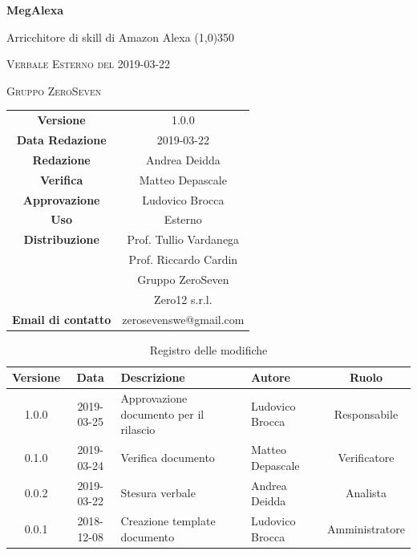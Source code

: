 \documentclass[a4paper,12pt]{article}
\author{Andrea Deidda}
\date{2019-03-22}
\begin{document}
	\begin{titlepage}
		\centering
		{\huge\bfseries MegAlexa\par}
		Arricchitore di skill di Amazon Alexa
		\line(1,0){350} \\
		{\scshape\LARGE Verbale Esterno del 2019-03-22 \par}
		\vspace{1cm}
		{\scshape Gruppo ZeroSeven \par}
		\logo
		\begin{tabular}{c|c}
			{\hfill \textbf{Versione}} 			& 1.0.0\\
			{\hfill\textbf{Data Redazione}} 	& 2019-03-22\\ 
			{\hfill\textbf{Redazione}} 			&  Andrea Deidda\\ 
			{\hfill\textbf{Verifica}} 			&   Matteo Depascale \\ 
			{\hfill\textbf{Approvazione}} 		&  	Ludovico Brocca \\ 
			{\hfill\textbf{Uso}} 					& 	Esterno	\\ 
			{\hfill\textbf{Distribuzione}} 			& 			Prof. Tullio Vardanega \\ & Prof. Riccardo Cardin \\ & Gruppo ZeroSeven \\ & Zero12 s.r.l.	\\ 
			{\hfill\textbf{Email di contatto}} & zerosevenswe@gmail.com \\
		\end{tabular}
	\end{titlepage}

	\label{LastFrontPage}
	
	\newpage
	\cleardoublepage
	\begin{table}[tbph]
		\centering
		\begin{tabularx}{\textwidth}{|c|c|X|X|c|}
			\hline
			\textbf{Versione} & \textbf{Data} & \textbf{Descrizione} & \textbf{Autore} & \textbf{Ruolo} \\
			\hline
			1.0.0 & 2019-03-25 & Approvazione documento per il rilascio & Ludovico Brocca  & Responsabile \\
			\hline
			0.1.0 & 2019-03-24 & Verifica documento & Matteo Depascale  & Verificatore \\
			\hline
			0.0.2 & 2019-03-22 & Stesura verbale & Andrea Deidda  & Analista \\
			\hline
			0.0.1 & 2018-12-08 & Creazione template documento & Ludovico Brocca & Amministratore\\
			\hline
		\end{tabularx}
		\caption{Registro delle modifiche}
	\end{table}
	\cleardoublepage
	\pagestyle{mymain}
	
\end{document}
